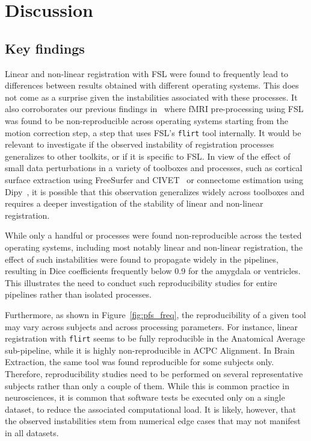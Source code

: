 \documentclass[a4paper,num-refs]{oup-contemporary}
\newcommand{\flirt}[0]{\texttt{flirt}\xspace}
\begin{document}
  

\section{Discussion}

\subsection{Key findings}

Linear and non-linear registration with FSL were found to
frequently lead to differences between results obtained with different
operating systems. This does not come as a surprise given the instabilities
associated with these processes. It also corroborates our previous findings
in~\cite{Glatard2015} where fMRI pre-processing using FSL was found to be
non-reproducible across operating systems starting from the motion
correction step, a step that uses FSL's \flirt tool internally. It
would be relevant to investigate if the observed instability of
registration processes generalizes to other toolkits, or if it is specific
to FSL. In view of the effect of small data perturbations in a variety of
toolboxes and processes, such as cortical surface extraction using
FreeSurfer and CIVET~\cite{Lewis2017-ll} or connectome estimation using
Dipy~\cite{kiar2019comparing}, it is possible that this observation
generalizes widely across toolboxes and requires a deeper investigation of
the stability of linear and non-linear registration.

While only a handful or processes were found non-reproducible across the
tested operating systems, including most notably linear and non-linear
registration, the effect of such instabilities were found to propagate
widely in the pipelines, resulting in Dice coefficients frequently below
0.9 for the amygdala or ventricles. This illustrates the need to conduct such 
reproducibility studies for entire pipelines rather than isolated processes.

Furthermore, as shown in Figure~\ref{fig:pfs_freq}, the reproducibility of
a given tool may vary across subjects and across processing parameters. For
instance, linear registration with \flirt seems to be fully reproducible in
the Anatomical Average sub-pipeline, while it is highly non-reproducible in
ACPC Alignment. In Brain Extraction, the same tool was found reproducible
for some subjects only. Therefore, reproducibility studies need to be
performed on several representative subjects rather than only a couple of
them. While this is common practice in neurosciences, it is common that
software tests be executed only on a single dataset, to reduce the
associated computational load. It is likely, however, that the observed
instabilities stem from numerical edge cases that may not manifest in all
datasets. 
\end{document}
